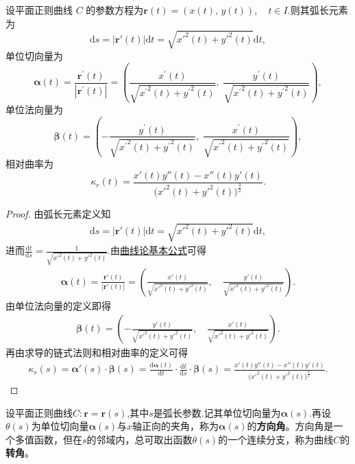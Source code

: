 \documentclass[../../main.tex]{subfiles}%
\begin{document}
\begin{theorem}\label{theorem:平面曲线一般参数公式}
设平面正则曲线 \(C\) 的参数方程为$\boldsymbol{r}(t) = (x(t),\, y(t)), \quad t \in I$.则其弧长元素为
\[
\mathrm{d}s=\left| \boldsymbol{r}' \left( t \right) \right|\mathrm{d}t=\sqrt{x'^2\left( t \right) +y'^2\left( t \right)}\mathrm{d}t,
\]
单位切向量为
\[
\boldsymbol{\alpha }\left( t \right) =\frac{\boldsymbol{r}^{\prime}\left( t \right)}{\left| \boldsymbol{r}^{\prime}\left( t \right) \right|}=\left( \frac{x^{\prime}\left( t \right)}{\sqrt{{x^{\prime}}^2\left( t \right) +{y^{\prime}}^2\left( t \right)}},\;\frac{y^{\prime}\left( t \right)}{\sqrt{{x^{\prime}}^2\left( t \right) +{y^{\prime}}^2\left( t \right)}} \right) ,
\]
单位法向量为
\[
\boldsymbol{\beta }\left( t \right) =\left( -\frac{y^{\prime}\left( t \right)}{\sqrt{{x^{\prime}}^2\left( t \right) +{y^{\prime}}^2\left( t \right)}},\;\frac{x^{\prime}\left( t \right)}{\sqrt{{x^{\prime}}^2\left( t \right) +{y^{\prime}}^2\left( t \right)}} \right) ,
\]
相对曲率为
\[
\kappa_r(t) = \frac{x'(t)y''(t) - x''(t)y'(t)}{\bigl(x'^2(t) + y'^2(t)\bigr)^{\frac{3}{2}}}.
\]
\end{theorem}
\begin{proof}
由弧长元素定义知
\begin{align*}
\mathrm{d}s=|\bm{r}'(t)|\mathrm{d}t=\sqrt{x'^2(t)+y'^2(t)}\mathrm{d}t,
\end{align*}
进而$\frac{\mathrm{d}t}{\mathrm{d}s}=\frac{1}{\sqrt{x'^2(t)+y'^2(t)}}.$由\hyperref[theorem:曲线论基本公式]{曲线论基本公式}可得
\begin{align*}
\bm{\alpha}(t)=\frac{\bm{r}'(t)}{|\bm{r}'(t)|}=\left( \frac{x'(t)}{\sqrt{x'^2(t)+y'^2(t)}},\quad\frac{y'(t)}{\sqrt{x'^2(t)+y'^2(t)}} \right).
\end{align*}
由单位法向量的定义即得
\begin{align*}
\bm{\beta}(t)=\left( -\frac{y'(t)}{\sqrt{x'^2(t)+y'^2(t)}},\quad\frac{x'(t)}{\sqrt{x'^2(t)+y'^2(t)}} \right).
\end{align*}
再由求导的链式法则和相对曲率的定义可得
\begin{align*}
\kappa_r(s)=\bm{\alpha}'(s)\cdot\bm{\beta}(s)=\frac{\mathrm{d}\bm{\alpha}(t)}{\mathrm{d}t}\cdot\frac{\mathrm{d}t}{\mathrm{d}s}\cdot\bm{\beta}(s)=\frac{x'(t)y''(t)-x''(t)y'(t)}{\bigl( x'^2(t)+y'^2(t) \bigr)^{\frac{3}{2}}}.
\end{align*}
\end{proof}

\begin{definition}
设平面正则曲线$C:\bm{r}=\bm{r}(s)$,其中$s$是弧长参数.记其单位切向量为$\bm{\alpha}(s)$.再设$\theta(s)$为单位切向量$\bm{\alpha}(s)$与$x$轴正向的夹角，称为$\bm{\alpha}(s)$的\textbf{方向角}。方向角是一个多值函数，但在$s$的邻域内，总可取出函数$\theta(s)$的一个连续分支，称为曲线$C$的\textbf{转角}。
\end{definition}
\end{document}
